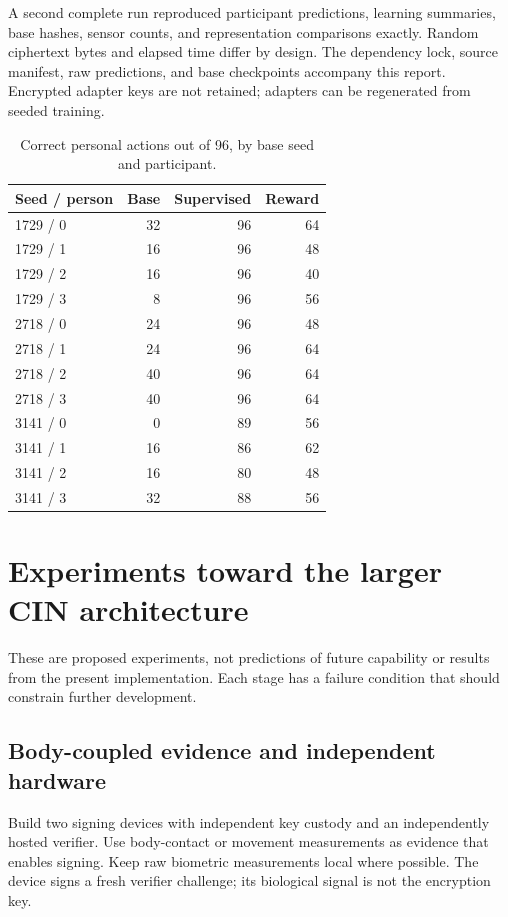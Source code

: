 \documentclass[11pt]{article}
\begin{document}
A second complete run reproduced participant predictions, learning summaries, base hashes, sensor counts, and representation comparisons exactly.
Random ciphertext bytes and elapsed time differ by design.
The dependency lock, source manifest, raw predictions, and base checkpoints accompany this report.
Encrypted adapter keys are not retained; adapters can be regenerated from seeded training.

\begin{table}[ht]
\centering\small
\caption{Correct personal actions out of 96, by base seed and participant.}
\begin{tabular}{@{}lrrr@{}}\toprule
Seed / person & Base & Supervised & Reward \\\midrule
1729 / 0 & 32 & 96 & 64\\
1729 / 1 & 16 & 96 & 48\\
1729 / 2 & 16 & 96 & 40\\
1729 / 3 & 8 & 96 & 56\\
2718 / 0 & 24 & 96 & 48\\
2718 / 1 & 24 & 96 & 64\\
2718 / 2 & 40 & 96 & 64\\
2718 / 3 & 40 & 96 & 64\\
3141 / 0 & 0 & 89 & 56\\
3141 / 1 & 16 & 86 & 62\\
3141 / 2 & 16 & 80 & 48\\
3141 / 3 & 32 & 88 & 56\\
\bottomrule\end{tabular}
\end{table}

\clearpage
\section{Experiments toward the larger CIN architecture}
These are proposed experiments, not predictions of future capability or results from the present implementation.
Each stage has a failure condition that should constrain further development.

\subsection{Body-coupled evidence and independent hardware}
Build two signing devices with independent key custody and an independently hosted verifier.
Use body-contact or movement measurements as evidence that enables signing.
Keep raw biometric measurements local where possible.
The device signs a fresh verifier challenge; its biological signal is not the encryption key.
\end{document}
